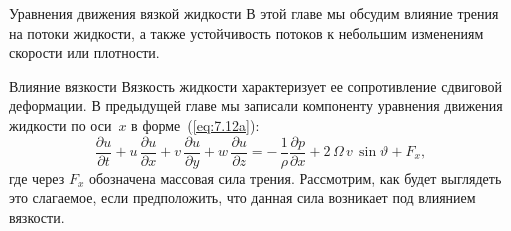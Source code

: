 \begin{chapter}{Уравнения движения вязкой жидкости}
В этой главе мы обсудим влияние трения на потоки жидкости, а также
устойчивость потоков к небольшим изменениям скорости или плотности.
%

\begin{section}{Влияние вязкости}
Вязкость жидкости характеризует ее сопротивление сдвиговой
деформации. В предыдущей главе мы записали компоненту уравнения движения 
жидкости по оси~$x$ в форме~(\ref{eq:7.12a}):
\begin{equation}\label{eq:8.1}
\frac{\partial{u}}{\partial{t}}+u\,\frac{\partial{u}}{\partial{x}}
 +v\,\frac{\partial{u}}{\partial{y}}+w\,\frac{\partial{u}}{\partial{z}}
=-\,\frac{1}{\rho}\frac{\partial{p}}{\partial{x}} + 2\,\Omega\,v\,\sin\vartheta + F_x,
\end{equation}
где через $F_x$ обозначена массовая сила трения. Рассмотрим, как
будет выглядеть это слагаемое, если предположить, что данная сила возникает 
под влиянием вязкости.
%


\end{section}
\end{chapter}
